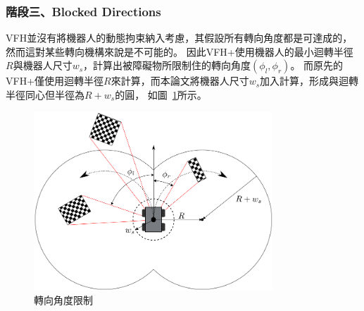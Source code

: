 \subsubsection{階段三、Blocked Directions}
VFH並沒有將機器人的動態拘束納入考慮，其假設所有轉向角度都是可達成的，然而這對某些轉向機構來說是不可能的。
因此VFH+使用機器人的最小迴轉半徑$R$與機器人尺寸$w_s$，計算出被障礙物所限制住的轉向角度$(\phi_l,\phi_r)$。
而原先的VFH+僅使用迴轉半徑$R$來計算，而本論文將機器人尺寸$w_s$加入計算，形成與迴轉半徑同心但半徑為$R+w_s$的圓，
如圖~\ref{f:block_directions}所示。
\begin{figure}
	\centering
	\includegraphics[width=0.8\textwidth]{figures/block_directions}
	\caption{轉向角度限制}
	\label{f:block_directions}
\end{figure}

